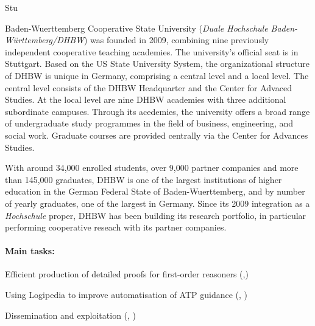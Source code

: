 \begin{sitedescription}{Stu}


Baden-Wuerttemberg Cooperative State University (\emph{Duale
  Hochschule Baden-Württemberg/DHBW}) was founded in 2009, combining
nine previously independent cooperative teaching academies. The
university's official seat is in Stuttgart. Based on the US State
University System, the organizational structure of DHBW is unique in
Germany, comprising a central level and a local level. The central
level consists of the DHBW Headquarter and the Center for Advaced
Studies. At the local level are nine DHBW academies with three
additional subordinate campuses. Through its acedemies, the university
offers a broad range of undergraduate study programmes in the field of
business, engineering, and social work. Graduate courses are provided
centrally via the Center for Advances Studies.


With around 34,000 enrolled students, over 9,000 partner companies and
more than 145,000 graduates, DHBW is one of the largest institutions
of higher education in the German Federal State of Baden-Wuerttemberg,
and by number of yearly graduates, one of the largest in Germany.
Since its 2009 integration as a \emph{Hochschule} proper, DHBW has
been building its research portfolio, in particular performing
cooperative reseach with its partner companies.


\paragraph*{Main tasks:}

\begin{compactitem}
\item Efficient production of detailed proofs for first-order
  reasoners (,)
\item Using Logipedia to improve automatisation of ATP guidance
  (, )
\item Dissemination and exploitation (,
  )
\end{compactitem}


\end{sitedescription}
